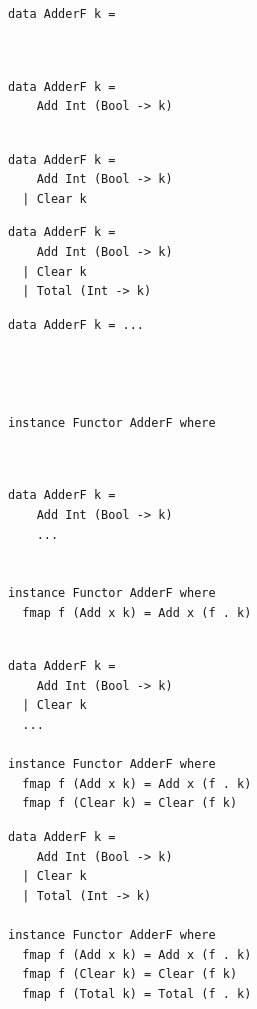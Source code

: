 \documentclass{beamer}
\begin{document}
\begin{frame}[fragile]
  \begin{overprint}
    \begin{verbatim}
data AdderF k =



    \end{verbatim}
    \begin{verbatim}
data AdderF k =
    Add Int (Bool -> k)


    \end{verbatim}
    \begin{verbatim}
data AdderF k =
    Add Int (Bool -> k)
  | Clear k

    \end{verbatim}
    \begin{verbatim}
data AdderF k =
    Add Int (Bool -> k)
  | Clear k
  | Total (Int -> k)
    \end{verbatim}
  \end{overprint}
\end{frame}

\begin{frame}[fragile]
  \begin{overprint}
    \begin{verbatim}
data AdderF k = ...




instance Functor AdderF where



    \end{verbatim}
    \begin{verbatim}
data AdderF k =
    Add Int (Bool -> k)
    ...


instance Functor AdderF where
  fmap f (Add x k) = Add x (f . k)


    \end{verbatim}
    \begin{verbatim}
data AdderF k =
    Add Int (Bool -> k)
  | Clear k
  ...

instance Functor AdderF where
  fmap f (Add x k) = Add x (f . k)
  fmap f (Clear k) = Clear (f k)

    \end{verbatim}
    \begin{verbatim}
data AdderF k =
    Add Int (Bool -> k)
  | Clear k
  | Total (Int -> k)

instance Functor AdderF where
  fmap f (Add x k) = Add x (f . k)
  fmap f (Clear k) = Clear (f k)
  fmap f (Total k) = Total (f . k)
    \end{verbatim}
  \end{overprint}
\end{frame}
\end{document}
